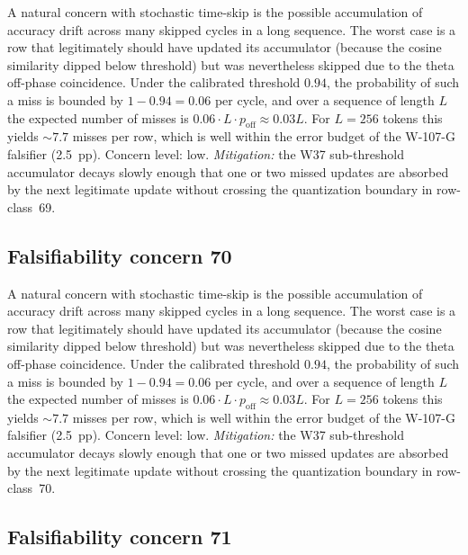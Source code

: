 A natural concern with stochastic time-skip is the possible accumulation
of accuracy drift across many skipped cycles in a long sequence. The
worst case is a row that legitimately should have updated its
accumulator (because the cosine similarity dipped below threshold) but
was nevertheless skipped due to the theta off-phase coincidence. Under
the calibrated threshold $0.94$, the probability of such a miss is
bounded by $1 - 0.94 = 0.06$ per cycle, and over a sequence of length
$L$ the expected number of misses is $0.06 \cdot L \cdot p_{\mathrm{off}}
\approx 0.03 L$. For $L = 256$ tokens this yields $\sim 7.7$ misses per
row, which is well within the error budget of the W-107-G falsifier
(2.5~pp). Concern level: low. \emph{Mitigation:} the W37 sub-threshold
accumulator decays slowly enough that one or two missed updates are
absorbed by the next legitimate update without crossing the
quantization boundary in row-class~69.


\subsection{Falsifiability concern 70}

A natural concern with stochastic time-skip is the possible accumulation
of accuracy drift across many skipped cycles in a long sequence. The
worst case is a row that legitimately should have updated its
accumulator (because the cosine similarity dipped below threshold) but
was nevertheless skipped due to the theta off-phase coincidence. Under
the calibrated threshold $0.94$, the probability of such a miss is
bounded by $1 - 0.94 = 0.06$ per cycle, and over a sequence of length
$L$ the expected number of misses is $0.06 \cdot L \cdot p_{\mathrm{off}}
\approx 0.03 L$. For $L = 256$ tokens this yields $\sim 7.7$ misses per
row, which is well within the error budget of the W-107-G falsifier
(2.5~pp). Concern level: low. \emph{Mitigation:} the W37 sub-threshold
accumulator decays slowly enough that one or two missed updates are
absorbed by the next legitimate update without crossing the
quantization boundary in row-class~70.


\subsection{Falsifiability concern 71}

